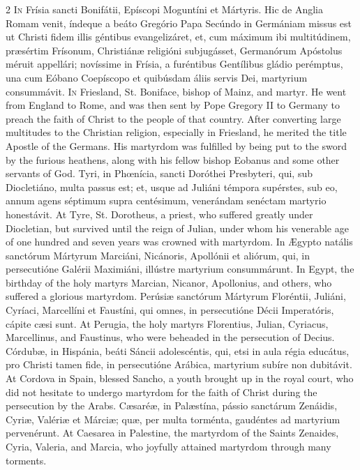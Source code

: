 \begin{paracol}{2}
\lettrine[lines=2]{I}{n} Frísia sancti 
 Bonifátii, Epíscopi Moguntíni et Mártyris. Hic de Anglia Romam venit, 
 índeque a beáto Gregório Papa Secúndo in Germániam missus est ut Christi 
 fidem illis géntibus evangelizáret, et, cum máximum ibi multitúdinem, 
 præsértim Frísonum, Christiánæ religióni subjugásset, Germanórum Apóstolus 
 méruit appellári; novíssime in Frísia, a furéntibus Gentílibus gládio 
 perémptus, una cum Eóbano Coepíscopo et quibúsdam áliis servis Dei, martyrium 
 consummávit.
\switchcolumn
{}
\lettrine[lines=2]{I}{n} Friesland, St. Boniface, bishop 
 of Mainz, and martyr. He went from England to Rome, and was then sent 
 by Pope Gregory II to Germany to preach the faith of Christ to the people of 
 that country. After converting large multitudes to the Christian 
 religion, especially in Friesland, he merited the title Apostle of the 
 Germans. His martyrdom was fulfilled by being put to the sword by the 
 furious heathens, along with his fellow bishop Eobanus and some other 
 servants of God.
\switchcolumn*
{}
Tyri, in Phœnícia, 
 sancti Doróthei Presbyteri, qui, sub Diocletiáno, multa passus est; et, 
 usque ad Juliáni témpora supérstes, sub eo, annum agens séptimum supra 
 centésimum, venerándam senéctam martyrio honestávit.
\switchcolumn
{}
At Tyre, St. Dorotheus, a priest, 
 who suffered greatly under Diocletian, but survived until the reign of 
 Julian, under whom his venerable age of one hundred and seven years was 
 crowned with martyrdom.
\switchcolumn*
{}
In Ægypto natális 
 sanctórum Mártyrum Marciáni, Nicánoris, Apollónii et aliórum, qui, in 
 persecutióne Galérii Maximiáni, illústre martyrium consummárunt.
\switchcolumn
{}
In Egypt, the birthday of the holy 
 martyrs Marcian, Nicanor, Apollonius, and others, who suffered a glorious 
 martyrdom.
\switchcolumn*
{}
Perúsiæ sanctórum 
 Mártyrum Floréntii, Juliáni, Cyríaci, Marcellíni et Faustíni, qui omnes, in 
 persecutióne Décii Imperatóris, cápite cæsi sunt.
\switchcolumn
{}
At Perugia, the holy martyrs 
 Florentius, Julian, Cyriacus, Marcellinus, and Faustinus, who were beheaded 
 in the persecution of Decius.
\switchcolumn*
{}
Córdubæ, in Hispánia, 
 beáti Sáncii adolescéntis, qui, etsi in aula régia educátus, pro Christi 
 tamen fide, in persecutióne Arábica, martyrium subíre non dubitávit.
\switchcolumn
{}
At Cordova in Spain, blessed Sancho, 
 a youth brought up in the royal court, who did not hesitate to undergo 
 martyrdom for the faith of Christ during the persecution by the Arabs.
\switchcolumn*
{}
Cæsaréæ, in Palæstína, 
 pássio sanctárum Zenáidis, Cyriæ, Valériæ et Márciæ; quæ, per multa torménta, 
 gaudéntes ad martyrium pervenérunt.
\switchcolumn
{}
At Caesarea in Palestine, the 
 martyrdom of the Saints Zenaides, Cyria, Valeria, and Marcia, who joyfully 
 attained martyrdom through many torments.
\switchcolumn*
{}
\end{paracol}


